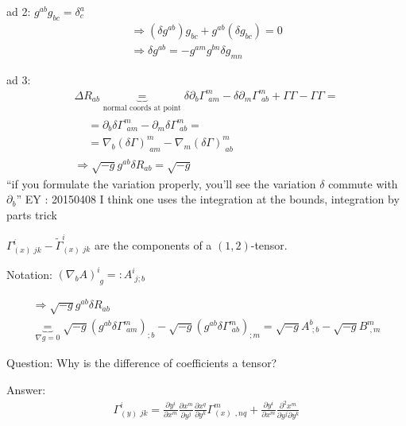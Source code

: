 	ad 2: $g^{ab}g_{bc} = \delta^a_c$
	\[
	\begin{gathered}
	\Longrightarrow (\delta g^{ab})g_{bc} + g^{ab}(\delta g_{bc}) = 0  \\
	\Longrightarrow \delta g^{ab} = -g^{am} g^{bn} \delta g_{mn}
	\end{gathered}
	\]
	
	ad 3: 
	\[
	\begin{gathered}
	\Delta R_{ab} \underbrace{=}_{\text{normal coords at point}} \delta \partial_b \Gamma^m_{ \, \, am} - \delta \partial_m \Gamma^m_{ \, \, ab} + \Gamma \Gamma - \Gamma \Gamma = \\
	\begin{aligned}
	& = \partial_b \delta \Gamma^m_{ \, \, am} - \partial_m \delta \Gamma^m_{ \, \, ab } = \\  
	& = \nabla_b (\delta \Gamma)^m_{ \, \, am} - \nabla_m (\delta \Gamma)^m_{ \, \, ab}
	\end{aligned} \\
	\Longrightarrow \sqrt{-g} g^{ab} \delta R_{ab} = \sqrt{-g}
	\end{gathered}
	\]
	``if you formulate the variation properly, you'll see the variation $\delta$ commute with $\partial _b$'' EY : 20150408 I think one uses the integration at the bounds, integration by parts trick
	
	$\Gamma^i_{(x) \, \, jk } - \widetilde{\Gamma}^i_{ (x) \, \, jk }$ are the components of a $(1,2)$-tensor.
	
	Notation: $(\nabla_b A)^i_{ \, \, g} =: A^i_{ \, \, j;b}$
	
	\[
	\begin{gathered}
	\Longrightarrow \sqrt{-g} g^{ab} \delta R_{ab}  \\
	\underbrace{=}_{ \nabla g = 0 } \sqrt{-g} (g^{ab} \delta \Gamma^m_{ \, \, am} )_{;b} - \sqrt{-g} (g^{ab} \delta \Gamma^m_{ \, \, ab} )_{ ; m} = \sqrt{-g} A^b_{ \, \, ; b} - \sqrt{-g} B^m_{ \, \, , m }
	\end{gathered}
	\]
	
	Question: Why is the difference of coefficients a tensor?
	
	Answer:
	\[
	\begin{aligned}
	\Gamma_{(y) \, \, jk}^i = \frac{ \partial y^i}{ \partial x^m} \frac{ \partial x^m}{ \partial y^j} \frac{ \partial x^q}{ \partial y^k} \Gamma^m_{(x) \,\ , nq} + \frac{ \partial y^i}{ \partial x^m} \frac{ \partial^2 x^m}{ \partial y^j \partial y^k}
	\end{aligned}
	\]
	
